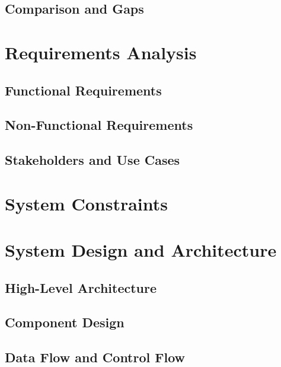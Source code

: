 \documentclass[conference, onecolumn]{IEEEtran}
\begin{document}
  \subsection{Comparison and Gaps}
  \label{subsec:related-comparison}



  \section{Requirements Analysis}
  \label{subsec:requirements}

  \subsection{Functional Requirements}
  \label{subsec:functional-requirements}

  \subsection{Non-Functional Requirements}
  \label{subsec:non-functional-requirements}

  \subsection{Stakeholders and Use Cases}
  \label{subsec:stakeholders}

  \section{System Constraints}
  \label{subsec:system-constraints}



  \section{System Design and Architecture}
  \label{sec:system-design}

  \subsection{High-Level Architecture}
  \label{subsec:high-level-architecture}

  \subsection{Component Design}
  \label{subsec:component-design}

  \subsection{Data Flow and Control Flow}
  \label{subsec:data-flow}
\end{document}
